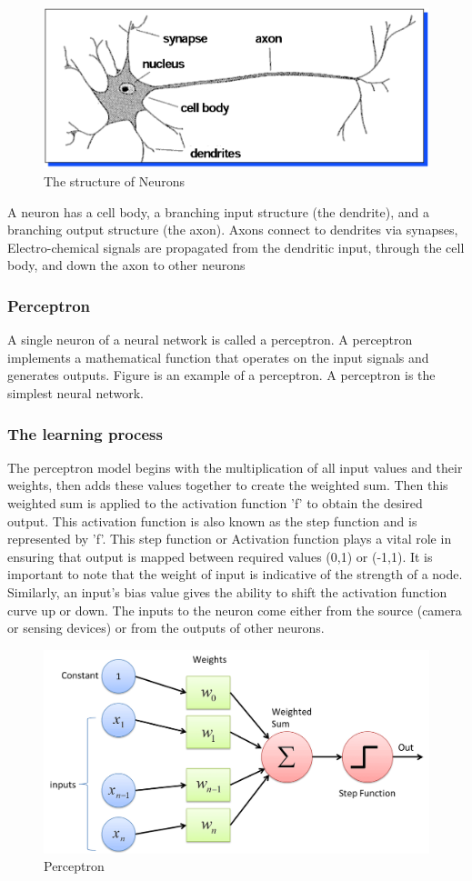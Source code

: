 \begin{figure}[H]
    \centering \includegraphics[width=0.5\linewidth]{tex/img/Structure_of_Neurons.PNG}
    \caption{The structure of Neurons}
    \label{fig:Neuron structure}
\end{figure}
A neuron has a cell body, a branching input structure (the dendrite), and a branching output structure (the axon). Axons connect to dendrites via synapses, Electro-chemical signals are propagated from the dendritic input, through the cell body, and down the axon to other neurons


\subsubsection{Perceptron}
A single neuron of a neural network is called a perceptron. A perceptron implements a mathematical function that operates on the input signals and generates outputs. Figure is an example of a perceptron. A perceptron is the simplest neural network.
\subsubsection{The learning process}
The perceptron model begins with the multiplication of all input values and their weights, then adds these values together to create the weighted sum. Then this weighted sum is applied to the activation function 'f' to obtain the desired output. This activation function is also known as the step function and is represented by 'f'. This step function or Activation function plays a vital role in ensuring that output is mapped between required values (0,1) or (-1,1). It is important to note that the weight of input is indicative of the strength of a node. Similarly, an input's bias value gives the ability to shift the activation function curve up or down.
The inputs to the neuron come either from the source (camera or sensing devices) or from the outputs of other neurons.

\begin{figure}[H]
    \centering
    \includegraphics[width=0.7\linewidth]{tex/img/Perceptron.png}
    \caption{Perceptron}
    \label{fig:Perceptron}
\end{figure}

